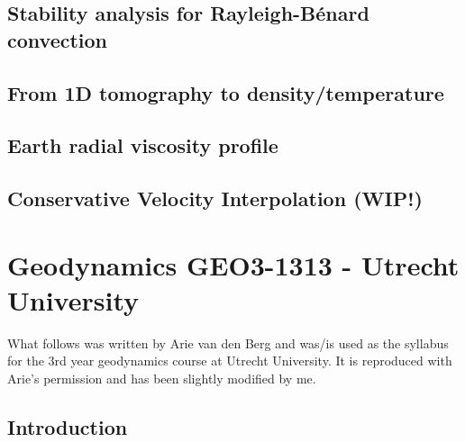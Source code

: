 \documentclass[a4paper]{article}
\begin{document}
\subsection{Stability analysis for Rayleigh-B\'enard convection} \label{ss:sarb}  %
\newpage %
\subsection{From 1D tomography to density/temperature} 
\newpage %
\subsection{Earth radial viscosity profile} 
\newpage %
\subsection{Conservative Velocity Interpolation (WIP!)} \label{sec:cvi}
\newpage %






\newpage
\section{Geodynamics GEO3-1313 - Utrecht University}
What follows was written by Arie van den Berg and was/is used as the syllabus for the 
3rd year geodynamics course at Utrecht University. It is reproduced with Arie's permission
and has been slightly modified by me.

\subsection{Introduction} %
\end{document}

